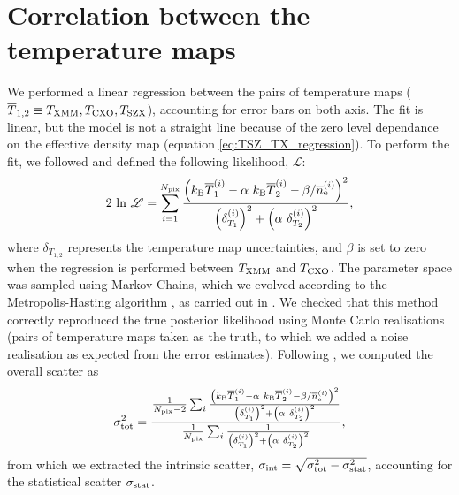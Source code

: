 \documentclass[twocolumn,traditabstract]{aa}
\def\TSZ {T_{\rm SZX}}
\def \TXC {T_{\rm CXO}}
\def \TXX {T_{\rm XMM}}
\begin{document}
\section{Correlation between the temperature maps}\label{append:correlation}
We performed a linear regression between the pairs of temperature maps ($\overline{T}_{1,2} \equiv \TXX, \TXC, \TSZ$), accounting for error bars on both axis. The fit is linear, but the model is not a straight line because of the zero level dependance on the effective density map (equation \ref{eq:TSZ_TX_regression}). To perform the fit, we followed \cite{Orear1982} and defined the following likelihood, $\mathscr{L}$:
\begin{equation}
2 \ {\rm ln} \ \mathscr{L} = \sum_{i=1}^{N_{\rm pix}} \frac{\left(k_{\rm B} \overline{T}^{(i)}_{1} - \alpha \ k_{\rm B} \overline{T}^{(i)}_{2} - {\beta}/{\overline{n}_{\rm e}^{(i)}}\right)^2}{\left(\delta^{(i)}_{T_{1}}\right)^2 + \left(\alpha \ \delta^{(i)}_{T_{2}}\right)^2},
\label{eq:chi2_def}
\end{equation}
where $\delta_{T_{1,2}}$ represents the temperature map uncertainties, and $\beta$ is set to zero when the regression is performed between $\TXX$ and $\TXC$. The parameter space was sampled using Markov Chains, which we evolved according to the Metropolis-Hasting algorithm \citep{Chib1995}, as carried out in \cite{Adam2015}. We checked that this method correctly reproduced the true posterior likelihood using Monte Carlo realisations (pairs of temperature maps taken as the truth, to which we added a noise realisation as expected from the error estimates). Following \citep{Pratt2009}, we computed the overall scatter as
\begin{equation}
\sigma_{\rm tot}^2 = \frac{\frac{1}{N_{\rm pix} - 2} \sum_i \frac{\left(k_{\rm B} \overline{T}^{(i)}_{1} - \alpha \ k_{\rm B} \overline{T}^{(i)}_{2} - {\beta}/{\overline{n}_{\rm e}^{(i)}}\right)^2}{\left(\delta^{(i)}_{T_{1}}\right)^2 + \left(\alpha \ \delta^{(i)}_{T_{2}}\right)^2}}{\frac{1}{N_{\rm pix}} \sum_i \frac{1}{\left(\delta^{(i)}_{T_{1}}\right)^2 + \left(\alpha \ \delta^{(i)}_{T_{2}}\right)^2}},
\label{eq:scatter_def}
\end{equation}
from which we extracted the intrinsic scatter, $\sigma_{\rm int} = \sqrt{\sigma_{\rm tot}^2 - \sigma_{\rm stat}^2}$, accounting for the statistical scatter $\sigma_{\rm stat}$.
\end{document}
